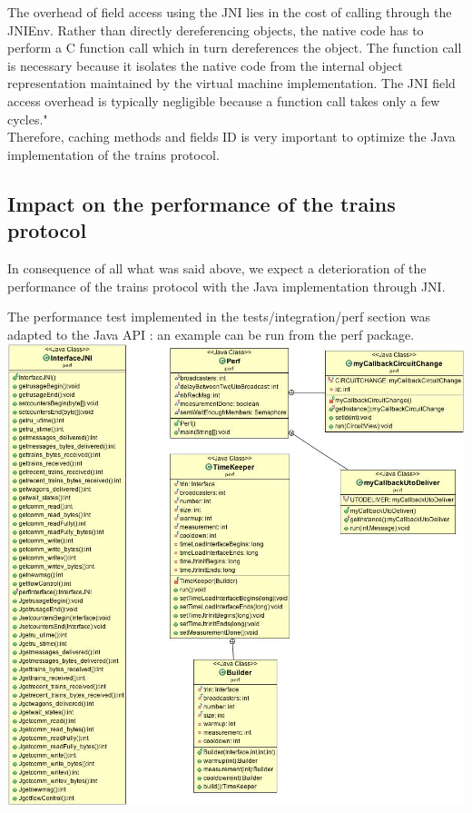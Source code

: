 \documentclass[a4paper,10pt]{report}
\begin{document}
The overhead of field access using the JNI lies in the cost of calling through the JNIEnv. Rather than directly dereferencing objects, 
the native code has to perform a C function call which in turn dereferences the object. The function call is necessary because it 
isolates the native code from the internal object representation maintained by the virtual machine implementation. The JNI field 
access overhead is typically negligible because a function call takes only a few cycles."\\

Therefore, caching methods and fields ID is very important to optimize the Java implementation of the trains protocol.

\subsection{Impact on the performance of the trains protocol}

In consequence of all what was said above, we expect a deterioration of the performance of the trains protocol with the Java implementation through JNI.

The performance test implemented in the tests/integration/perf section was adapted to the Java API : an example can be run from the perf package.\\

\includegraphics[scale=0.55]{img/perf.jpg}\\
\end{document}
